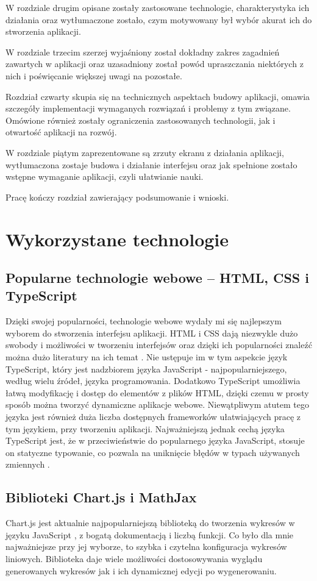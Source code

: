 \documentclass{SGGW-thesis}
\begin{document}
	W rozdziale drugim opisane zostały zastosowane technologie, charakterystyka ich działania oraz wytłumaczone zostało, czym motywowany był wybór akurat ich do stworzenia aplikacji.
	
	W rozdziale trzecim szerzej wyjaśniony został dokładny zakres zagadnień zawartych w aplikacji oraz uzasadniony został powód upraszczania niektórych z nich i poświęcanie większej uwagi na pozostałe.
	
	Rozdział czwarty skupia się na technicznych aspektach budowy aplikacji, omawia szczegóły implementacji wymaganych rozwiązań i problemy z tym związane. Omówione również zostały ograniczenia zastosowanych technologii, jak i otwartość aplikacji na rozwój.
	
	W rozdziale piątym zaprezentowane są zrzuty ekranu z działania aplikacji, wytłumaczona zostaje budowa i działanie interfejsu oraz jak spełnione zostało wstępne wymaganie aplikacji, czyli ułatwianie nauki.
	
	Pracę kończy rozdział zawierający podsumowanie i wnioski.
	
	
\chapter{Wykorzystane technologie}
	\section{Popularne technologie webowe -- HTML, CSS i TypeScript}
	Dzięki swojej popularności, technologie webowe wydały mi się najlepszym wyborem do stworzenia interfejsu aplikacji. HTML i CSS dają niezwykle dużo swobody i możliwości w tworzeniu interfejsów oraz dzięki ich popularności znaleźć można dużo literatury na ich temat \cite{mozilla-HTML} \cite{mozilla-CSS}. Nie ustępuje im w tym aspekcie język TypeScript, który jest nadzbiorem języka JavaScript - najpopularniejszego, według wielu źródeł, języka programowania. Dodatkowo TypeScript umożliwia łatwą modyfikację i dostęp do elementów z plików HTML, dzięki czemu w prosty sposób można tworzyć dynamiczne aplikacje webowe. Niewątpliwym atutem tego języka jest również duża liczba dostępnych frameworków \cite{React} \cite{Angular} \cite{Vue} \cite{Svelte} ułatwiających pracę z tym językiem, przy tworzeniu aplikacji. Najważniejszą jednak cechą języka TypeScript jest, że w przeciwieństwie do popularnego języka JavaScript, stosuje on statyczne typowanie, co pozwala na uniknięcie błędów w typach używanych zmiennych \cite{TS}.
	
	\section{Biblioteki Chart.js i MathJax}
	Chart.js jest aktualnie najpopularniejszą biblioteką do tworzenia wykresów w języku JavaScript \cite{chartjs}, z bogatą dokumentacją i liczbą funkcji. Co było dla mnie najważniejsze przy jej wyborze, to szybka i czytelna konfiguracja wykresów liniowych. Biblioteka daje wiele możliwości dostosowywania wyglądu generowanych wykresów jak i ich dynamicznej edycji po wygenerowaniu.
	
\end{document}
